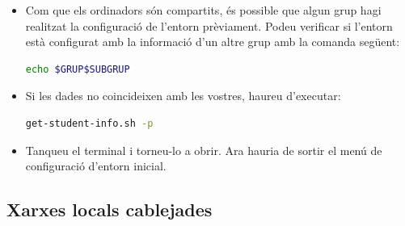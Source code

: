 \documentclass[12pt,a4paper]{article}
\begin{document}
\begin{itemize}
 \item Com que els ordinadors són compartits, és possible que algun grup hagi realitzat la configuració de l'entorn prèviament. Podeu verificar si l'entorn està configurat amb la informació d'un altre grup amb la comanda següent:
  \begin{lstlisting}[language=bash,basicstyle=\footnotesize]
   echo $GRUP$SUBGRUP
\end{lstlisting}
 \item Si les dades no coincideixen amb les vostres, haureu d'executar:
   \begin{lstlisting}[language=bash,basicstyle=\footnotesize]
   get-student-info.sh -p
\end{lstlisting}
\item Tanqueu el terminal i torneu-lo a obrir. Ara hauria de sortir el menú de configuració d'entorn inicial.
\end{itemize}


\subsection{Xarxes locals cablejades}
\end{document}
